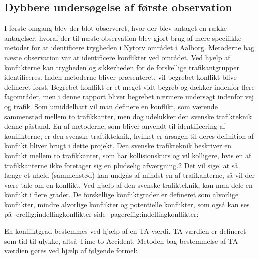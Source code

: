 \subsection{Dybbere undersøgelse af første observation}
\label{sec:dybundersogelse}
I første omgang blev der blot observeret, hvor der blev antaget en række antagelser, hvoraf der til næste observation blev gjort brug af mere specifikke metoder for at identificere trygheden i Nytorv området i Aalborg.
Metoderne bag næste observation var at identificere konflikter ved området. Ved hjælp af konflikterne kan trygheden og sikkerheden for de forskellige trafikantgrupper identificeres. Inden metoderne bliver præsenteret, vil begrebet konflikt blive defineret først. Begrebet konflikt er et meget vidt begreb og dækker indenfor flere fagområder, men i denne rapport bliver begrebet nærmere undersøgt indenfor vej og trafik. Som umiddelbart vil man definere en konflikt, som værende sammenstød mellem to trafikkanter, men dog udelukker den svenske trafikteknik denne påstand.%
En af metoderne, som bliver anvendt til identificering af konflikterne, er den svenske traftikteknik, hvilket er årsagen til deres definition af konflikt bliver brugt i dette projekt.
Den svenske trafikteknik beskriver en konflikt mellem to trafikkanter, som har kollisionskurs og vil kolligere, hvis en af trafikkanterne ikke foretager sig en pludselig afværgning.2 Det vil sige, at så længe et uheld (sammenstød) kan undgås af mindst en af trafikanterne, så vil der være tale om en konflikt. Ved hjælp af den svenske trafikteknik, kan man dele en konflikt i flere grader. De forskellige konfliktgrader er defineret som alvorlige konflikter, mindre alvorlige konflikter og potentielle konflikter, som også kan ses på -cref{fig:indellingkonflikter} side -pageref{fig:indellingkonflikter}:
\newpage

En konfliktgrad bestemmes ved hjælp af en TA-værdi. TA-værdien er defineret som tid til ulykke, altså Time to Accident. Metoden bag bestemmelse af TA-værdien gøres ved hjælp af følgende formel:

